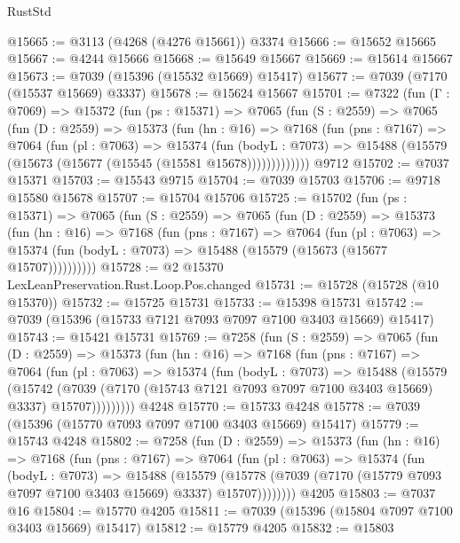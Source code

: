 \begin{lexlean}{RustStd}
\begin{coremodule}
@15665 := @3113 (@4268 (@4276 @15661)) @3374
@15666 := @15652 @15665
@15667 := @4244 @15666
@15668 := @15649 @15667
@15669 := @15614 @15667
@15673 := @7039 (@15396 (@15532 @15669) @15417)
@15677 := @7039 (@7170 (@15537 @15669) @3337)
@15678 := @15624 @15667
@15701 := @7322
    (fun (Γ : @7069) =>
    @15372
      (fun (ps : @15371) =>
      @7065
        (fun (S : @2559) =>
        @7065
          (fun (D : @2559) =>
          @15373
            (fun (hn : @16) =>
            @7168
              (fun (pns : @7167) =>
              @7064
                (fun (pl : @7063) =>
                @15374
                  (fun (bodyL : @7073) =>
                  @15488 (@15579 (@15673 (@15677 (@15545 (@15581 @15678)))))))))))))
    @9712
@15702 := @7037 @15371
@15703 := @15543 @9715
@15704 := @7039 @15703
@15706 := @9718 @15580 @15678
@15707 := @15704 @15706
@15725 := @15702
    (fun (ps : @15371) =>
    @7065
      (fun (S : @2559) =>
      @7065
        (fun (D : @2559) =>
        @15373
          (fun (hn : @16) =>
          @7168
            (fun (pns : @7167) =>
            @7064
              (fun (pl : @7063) =>
              @15374 (fun (bodyL : @7073) => @15488 (@15579 (@15673 (@15677 @15707))))))))))
@15728 := @2 @15370 LexLeanPreservation.Rust.Loop.Pos.changed
@15731 := @15728 (@15728 (@10 @15370))
@15732 := @15725 @15731
@15733 := @15398 @15731
@15742 := @7039 (@15396 (@15733 @7121 @7093 @7097 @7100 @3403 @15669) @15417)
@15743 := @15421 @15731
@15769 := @7258
    (fun (S : @2559) =>
    @7065
      (fun (D : @2559) =>
      @15373
        (fun (hn : @16) =>
        @7168
          (fun (pns : @7167) =>
          @7064
            (fun (pl : @7063) =>
            @15374
              (fun (bodyL : @7073) =>
              @15488
                (@15579
                  (@15742
                    (@7039
                      (@7170 (@15743 @7121 @7093 @7097 @7100 @3403 @15669) @3337)
                      @15707)))))))))
    @4248
@15770 := @15733 @4248
@15778 := @7039 (@15396 (@15770 @7093 @7097 @7100 @3403 @15669) @15417)
@15779 := @15743 @4248
@15802 := @7258
    (fun (D : @2559) =>
    @15373
      (fun (hn : @16) =>
      @7168
        (fun (pns : @7167) =>
        @7064
          (fun (pl : @7063) =>
          @15374
            (fun (bodyL : @7073) =>
            @15488
              (@15579
                (@15778 (@7039 (@7170 (@15779 @7093 @7097 @7100 @3403 @15669) @3337) @15707))))))))
    @4205
@15803 := @7037 @16
@15804 := @15770 @4205
@15811 := @7039 (@15396 (@15804 @7097 @7100 @3403 @15669) @15417)
@15812 := @15779 @4205
@15832 := @15803

\end{coremodule}
\end{lexlean}
